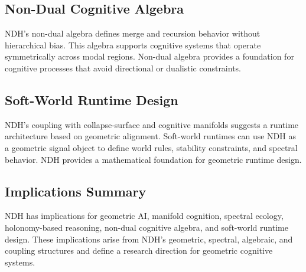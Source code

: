 \subsection{Non-Dual Cognitive Algebra}

NDH's non-dual algebra defines merge and recursion behavior without hierarchical
bias. This algebra supports cognitive systems that operate symmetrically across
modal regions. Non-dual algebra provides a foundation for cognitive processes
that avoid directional or dualistic constraints.

\subsection{Soft-World Runtime Design}

NDH's coupling with collapse-surface and cognitive manifolds suggests a runtime
architecture based on geometric alignment. Soft-world runtimes can use NDH as a
geometric signal object to define world rules, stability constraints, and
spectral behavior. NDH provides a mathematical foundation for geometric runtime
design.

\subsection{Implications Summary}

NDH has implications for geometric AI, manifold cognition, spectral ecology,
holonomy-based reasoning, non-dual cognitive algebra, and soft-world runtime
design. These implications arise from NDH's geometric, spectral, algebraic, and
coupling structures and define a research direction for geometric cognitive
systems.
